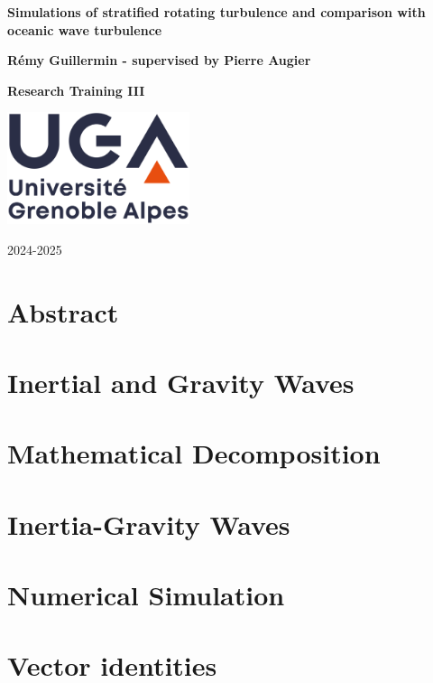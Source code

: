 \documentclass[11pt]{report}
\begin{document}
\pagestyle{fancy}
\fancyhf{}
\fancyhead[LE]{\nouppercase{\rightmark\hfill\leftmark}}
\fancyhead[RO]{\nouppercase{\leftmark\hfill\rightmark}}
\fancyfoot[C]{\thepage}

\begin{titlepage}
   \begin{center}
       \vspace*{1cm}
		
		\Huge
       \textbf{Simulations of stratified rotating turbulence and comparison with oceanic wave turbulence}
            
       \vspace{1.5cm}
       
       \LARGE
       \textbf{Rémy Guillermin - supervised by Pierre Augier}
       
       \vfill
       
       \Large
       \textbf{Research Training III}
            
       \vspace{0.8cm}
     
       \includegraphics[width=0.4\textwidth]{UGA-logo}
		
		\vspace{0.8cm}
		
       2024-2025
            
   \end{center}
\end{titlepage}

\chapter*{Abstract}

\tableofcontents

\newpage
\chapter{Inertial and Gravity Waves}


\chapter{Mathematical Decomposition}


\chapter{Inertia-Gravity Waves}


\chapter{Numerical Simulation}




\appendix
\chapter{Vector identities}


\printbibliography
\end{document}
